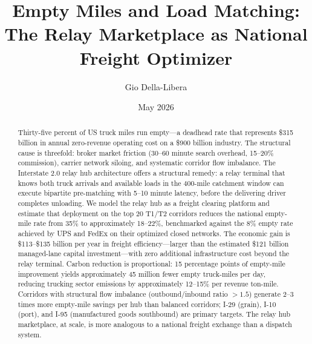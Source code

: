 \documentclass[12pt]{article}
\title{Empty Miles and Load Matching:\\
       The Relay Marketplace as National Freight Optimizer}
\author{Gio Della-Libera}
\date{May 2026}
\begin{document}
\maketitle
\begin{abstract}
Thirty-five percent of US truck miles run empty---a deadhead rate that represents \$315 billion in annual zero-revenue operating cost on a \$900 billion industry. The structural cause is threefold: broker market friction (30--60 minute search overhead, 15--20\% commission), carrier network siloing, and systematic corridor flow imbalance. The Interstate 2.0 relay hub architecture offers a structural remedy: a relay terminal that knows both truck arrivals and available loads in the 400-mile catchment window can execute bipartite pre-matching with 5--10 minute latency, before the delivering driver completes unloading. We model the relay hub as a freight clearing platform and estimate that deployment on the top 20 T1/T2 corridors reduces the national empty-mile rate from 35\% to approximately 18--22\%, benchmarked against the 8\% empty rate achieved by UPS and FedEx on their optimized closed networks. The economic gain is \$113--\$135 billion per year in freight efficiency---larger than the estimated \$121 billion managed-lane capital investment---with zero additional infrastructure cost beyond the relay terminal. Carbon reduction is proportional: 15 percentage points of empty-mile improvement yields approximately 45 million fewer empty truck-miles per day, reducing trucking sector emissions by approximately 12--15\% per revenue ton-mile. Corridors with structural flow imbalance (outbound/inbound ratio $> 1.5$) generate 2--3 times more empty-mile savings per hub than balanced corridors; I-29 (grain), I-10 (port), and I-95 (manufactured goods southbound) are primary targets. The relay hub marketplace, at scale, is more analogous to a national freight exchange than a dispatch system.
\end{abstract}










\end{document}
